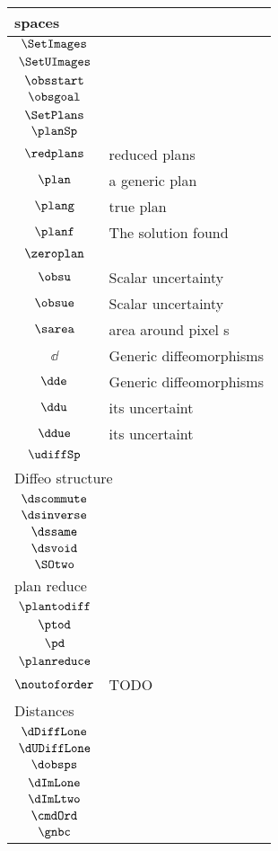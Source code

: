 \begin{longtable}{cl}
 \hline
\multicolumn{2}{l}{spaces}\\ 
 \hline
$\SetImages$ & \\ 
 $\SetUImages$ & \\ 
 $\obsstart$ & \\ 
 $\obsgoal$ & \\ 
 $\SetPlans$ & \\ 
 $\planSp$ & \\ 
 $\redplans$ &  reduced plans\\ 
 $\plan$ &  a generic plan\\ 
 $\plang$ &  true plan\\ 
 $\planf$ &  The solution found \\ 
 $\zeroplan$ & \\ 
 $\obsu$ &  Scalar uncertainty\\ 
 $\obsue$ &  Scalar uncertainty\\ 
 $\sarea$ &  area around pixel s\\ 
 $\dd$ &  Generic diffeomorphisms\\ 
 $\dde$ &  Generic diffeomorphisms\\ 
 $\ddu$ &  its uncertaint\\ 
 $\ddue$ &  its uncertaint\\ 
 $\udiffSp$ & \\ 
 \multicolumn{2}{l}{Diffeo structure}\\ 
 \hline
$\dscommute$ & \\ 
 $\dsinverse$ & \\ 
 $\dssame$ & \\ 
 $\dsvoid$ & \\ 
 $\SOtwo$ & \\ 
 \multicolumn{2}{l}{plan reduce}\\ 
 \hline
$\plantodiff$ & \\ 
 $\ptod$ & \\ 
 $\pd$ & \\ 
 $\planreduce$ & \\ 
 $\noutoforder$ &  TODO\\ 
 \multicolumn{2}{l}{Distances}\\ 
 \hline
$\dDiffLone$ & \\ 
 $\dUDiffLone$ & \\ 
 $\dobsps$ & \\ 
 $\dImLone$ & \\ 
 $\dImLtwo$ & \\ 
 $\cmdOrd$ & \\ 
 $\gnbc$ & \\ 

\end{longtable}
